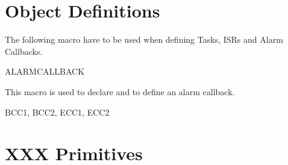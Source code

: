 
\pagebreak











\section{Object Definitions}
The following macro have to be used when defining Tasks, ISRs and
Alarm Callbacks.

\begin{function_nopb}{ALARMCALLBACK}
  \begin{fundescription}
    This macro is used to declare and to define an alarm callback.
  \end{fundescription}
  \begin{funparameters}
  \end{funparameters}
  \begin{funconformance}
    BCC1, BCC2, ECC1, ECC2
  \end{funconformance}
\end{function_nopb}











\pagebreak


\section{XXX Primitives}


\pagebreak


